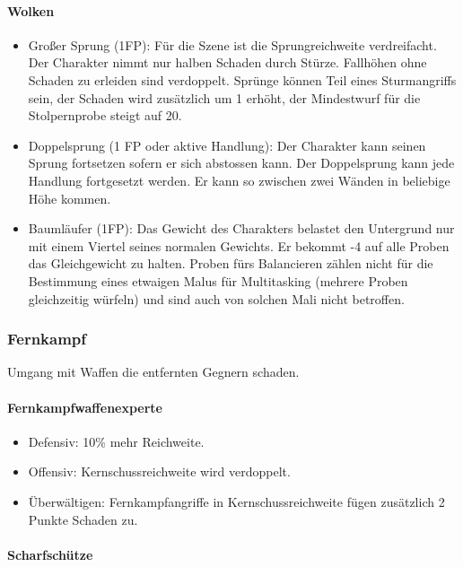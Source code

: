 \documentclass{article}
\begin{document}
\paragraph{Wolken}

\begin{itemize}
\item Großer Sprung (1FP): Für die Szene ist die Sprungreichweite verdreifacht. Der Charakter nimmt nur halben Schaden durch Stürze. Fallhöhen ohne Schaden zu erleiden sind verdoppelt. Sprünge können Teil eines Sturmangriffs sein, der Schaden wird zusätzlich um 1 erhöht, der Mindestwurf für die Stolpernprobe steigt auf 20.
\item Doppelsprung (1 FP oder aktive Handlung): Der Charakter kann seinen Sprung fortsetzen sofern er sich abstossen kann. Der Doppelsprung kann jede Handlung fortgesetzt werden. Er kann so zwischen zwei Wänden in beliebige Höhe kommen.
\item Baumläufer (1FP): Das Gewicht des Charakters belastet den Untergrund nur mit einem Viertel seines normalen Gewichts. Er bekommt -4 auf alle Proben das Gleichgewicht zu halten. Proben fürs Balancieren zählen nicht für die Bestimmung eines etwaigen Malus für Multitasking (mehrere Proben gleichzeitig würfeln) und sind auch von solchen Mali nicht betroffen.
\end{itemize}

\subsubsection{Fernkampf}

Umgang mit Waffen die entfernten Gegnern schaden.

\paragraph{Fernkampfwaffenexperte}

\begin{itemize}
\item Defensiv: 10\% mehr Reichweite.
\item Offensiv: Kernschussreichweite wird verdoppelt.
\item Überwältigen: Fernkampfangriffe in Kernschussreichweite fügen zusätzlich 2 Punkte Schaden zu.
\end{itemize}

\paragraph{Scharfschütze}
\end{document}
